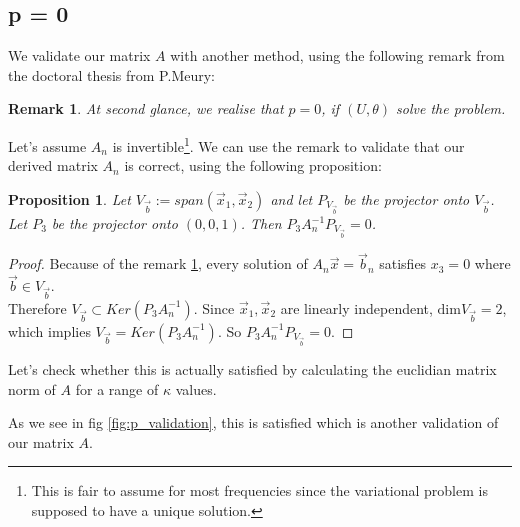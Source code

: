 \documentclass[10pt,journal,compsoc, onecolumn]{IEEEtran}
\newtheorem{proposition}[theorem]{Proposition}
\newtheorem{remark}[theorem]{Remark}
\begin{document}
\subsection{p = 0}
We validate our matrix $A$ with another method, using the following remark from the doctoral
thesis from P.Meury:
\begin{remark}
    \label{rem:pzero}
At second glance, we realise that \(p=0\), if \((U, \theta)\) solve the problem. \\
\end{remark}
Let's assume $A_n$ is invertible\footnote{This is fair to assume for most frequencies since the variational problem is supposed to have a unique solution.}.
We can use the remark to validate that our derived matrix $A_n$ is correct, using the following proposition:
\begin{proposition}
    Let $V_{\vec{b}} := span( \vec{x}_1, \vec{x}_2)$ and let
     $P_{V_{\vec{b}}}$ be the projector onto $V_{\vec{b}}$.
     Let $P_3$ be the projector onto $(0, 0, 1)$.
     Then $P_3A_n^{-1}P_{V_{\vec{b}}} = 0$.
\end{proposition}
\begin{proof}
    Because of the remark \ref{rem:pzero}, every solution of  $A_n \vec{x} = \vec{b}_n$ satisfies $x_3 = 0$
    where $\vec{b} \in V_{\vec{b}}$. \\
    Therefore $ V_{\vec{b}} \subset Ker(P_3A_n^{-1})$. 
    Since $\vec{x}_1, \vec{x}_2$ are linearly independent, $\mathrm{dim} V_{\vec{b}} =2$, which implies $ V_{\vec{b}} = Ker(P_3A_n^{-1})$.
    So $P_3A_n^{-1}P_{V_{\vec{b}}} = 0$.
\end{proof}
    

Let's check whether this is actually satisfied 
by calculating the euclidian matrix norm of $A$ for a range of $\kappa$ values. 

As we see in fig \ref{fig:p_validation}, this is satisfied which is another validation of our matrix $A$.
\end{document}

